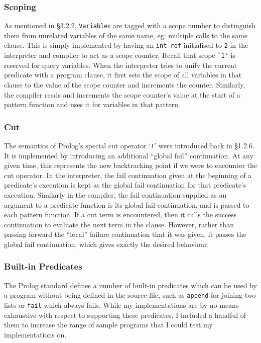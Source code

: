 \documentclass[12pt]{article}
\begin{document}
\subsubsection{Scoping}

As mentioned in \S3.2.2, \verb|Variable|s are tagged with a scope number to distinguish them from unrelated variables of the same name, eg: multiple calls to the same clause.
This is simply implemented by having an \verb|int ref| initialised to \verb|2| in the interpreter and compiler to act as a scope counter.
Recall that scope \verb|`1'| is reserved for query variables.
When the interpreter tries to unify the current predicate with a program clause, it first sets the scope of all variables in that clause to the value of the scope counter and increments the counter. 
Similarly, the compiler reads and increments the scope counter's value at the start of a pattern function and uses it for variables in that pattern.

\subsubsection{Cut}

The semantics of Prolog's special cut operator `\verb|!|' were introduced back in \S1.2.6.
It is implemented by introducing an additional ``global fail'' continuation. 
At any given time, this represents the new backtracking point if we were to encounter the cut operator. 
In the interpreter, the fail continuation given at the beginning of a predicate's execution is kept as the global fail continuation for that predicate's execution. 
Similarly in the compiler, the fail continuation supplied as an argument to a predicate function is its global fail continuation, and is passed to each pattern function.
If a cut term is encountered, then it calls the success continuation to evaluate the next term in the clause.
However, rather than passing forward the ``local'' failure continuation that it was given, it passes the global fail continuation, which gives exactly the desired behaviour.

\subsubsection{Built-in Predicates}

The Prolog standard defines a number of built-in predicates which can be used by a program without being defined in the source file, such as \verb|append| for joining two lists or \verb|fail| which always fails. 
While my implementations are by no means exhaustive with respect to supporting these predicates, I included a handful of them to increase the range of sample programs that I could test my implementations on.
\end{document}
